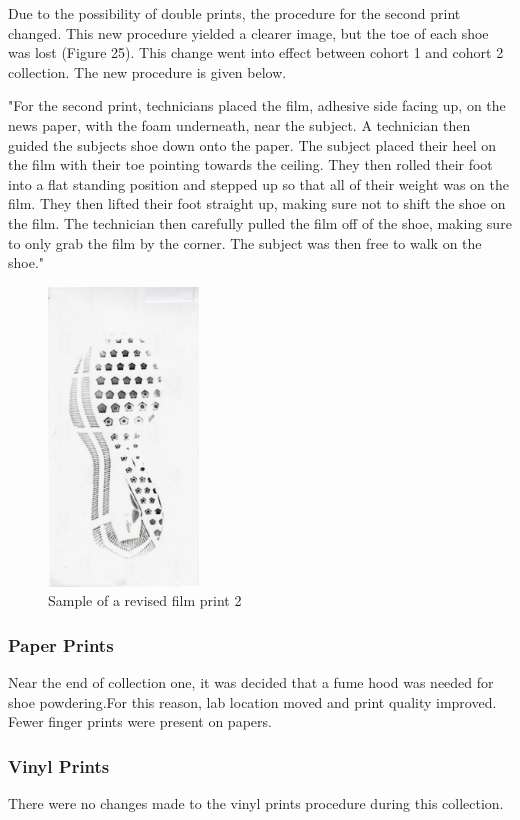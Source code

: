 Due to the possibility of double prints, the procedure for the second print changed. This new procedure yielded a clearer image, but the toe of each shoe was lost (Figure 25). This change went into effect between cohort 1 and cohort 2 collection. The new procedure is given below. 

 "For the second print, technicians placed the film, adhesive side facing up, on the news paper, with the foam underneath, near the subject. A technician then guided the subjects shoe down onto the paper. The subject placed their heel on the film with their toe pointing towards the ceiling. They then rolled their foot into a flat standing position and stepped up so that all of their weight was on the film. They then lifted their foot straight up, making sure not to shift the shoe on the film. The technician then carefully pulled the film off of the shoe, making sure to only grab the film by the corner. The subject was then free to walk on the shoe." 
 
\begin{figure}[!htp]
\centering
\includegraphics[width=4cm]{New_Film}
\caption{Sample of a revised film print 2}
\label{Image 25}
\end{figure}

\newpage

\subsubsection{Paper Prints}
Near the end of collection one, it was decided that a fume hood was needed for shoe powdering.For this reason, lab location moved and print quality improved. Fewer finger prints were present on papers. 
\subsubsection{Vinyl Prints}
There were no changes made to the vinyl prints procedure during this collection.

